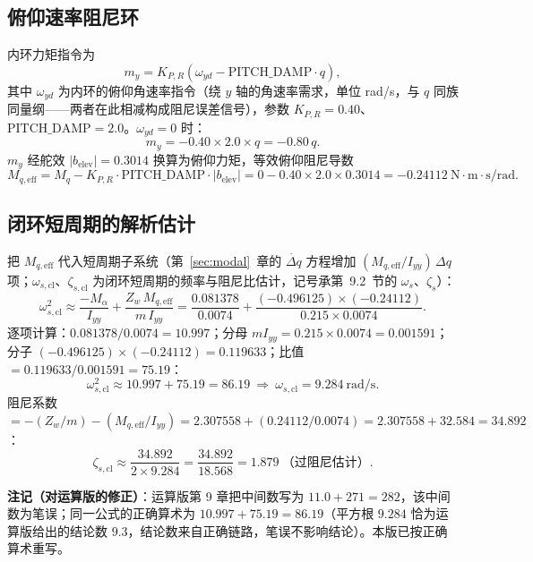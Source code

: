 \documentclass[11pt,a4paper]{ctexart}
\newcommand{\ud}[1]{\dot{#1}}
\begin{document}
\subsection{俯仰速率阻尼环}

内环力矩指令为
\[
m_y = K_{P,R}\left(\omega_{yd} - \mathrm{PITCH\_DAMP}\cdot q\right),
\]
其中 $\omega_{yd}$ 为内环的俯仰角速率指令（绕 $y$ 轴的角速率需求，单位 rad/s，与 $q$ 同族同量纲——两者在此相减构成阻尼误差信号），参数 $K_{P,R}=0.40$、$\mathrm{PITCH\_DAMP}=2.0$。$\omega_{yd}=0$ 时：
\[
m_y = -0.40\times 2.0\times q = -0.80\,q.
\]
$m_y$ 经舵效 $|b_{\mathrm{elev}}|=0.3014$ 换算为俯仰力矩，等效俯仰阻尼导数
\begin{equation}\label{eq:10-2}
M_{q,\mathrm{eff}} = M_q - K_{P,R}\cdot\mathrm{PITCH\_DAMP}\cdot|b_{\mathrm{elev}}|
= 0 - 0.40\times 2.0\times 0.3014 = -0.24112\ \mathrm{N\cdot m\cdot s/rad}.
\tag{(10-2)}
\end{equation}

\subsection{闭环短周期的解析估计}

把 $M_{q,\mathrm{eff}}$ 代入短周期子系统（第~\ref{sec:modal}~章的 $\ud{\Delta q}$ 方程增加 $(M_{q,\mathrm{eff}}/I_{yy})\,\Delta q$ 项；$\omega_{s,\mathrm{cl}}$、$\zeta_{s,\mathrm{cl}}$ 为闭环短周期的频率与阻尼比估计，记号承第~9.2~节的 $\omega_s$、$\zeta_s$）：
\[
\omega_{s,\mathrm{cl}}^2 \approx \frac{-M_\alpha}{I_{yy}} + \frac{Z_w\,M_{q,\mathrm{eff}}}{m\,I_{yy}}
= \frac{0.081378}{0.0074} + \frac{(-0.496125)\times(-0.24112)}{0.215\times 0.0074}.
\]
逐项计算：$0.081378/0.0074 = 10.997$；分母 $m I_{yy} = 0.215\times 0.0074 = 0.001591$；分子 $(-0.496125)\times(-0.24112) = 0.119633$；比值 $= 0.119633/0.001591 = 75.19$：
\[
\omega_{s,\mathrm{cl}}^2 \approx 10.997 + 75.19 = 86.19
\ \Longrightarrow\
\omega_{s,\mathrm{cl}} = 9.284\ \mathrm{rad/s}.
\]
阻尼系数 $= -(Z_w/m) - (M_{q,\mathrm{eff}}/I_{yy}) = 2.307558 + (0.24112/0.0074) = 2.307558+32.584 = 34.892$：
\[
\zeta_{s,\mathrm{cl}} \approx \frac{34.892}{2\times 9.284} = \frac{34.892}{18.568} = 1.879\ \text{（过阻尼估计）}.
\]

\begin{notebox}
\textbf{注记（对运算版的修正）}：运算版第 9 章把中间数写为 $11.0+271=282$，该中间数为笔误；同一公式的正确算术为 $10.997+75.19=86.19$（平方根 $9.284$ 恰为运算版给出的结论数 $9.3$，结论数来自正确链路，笔误不影响结论）。本版已按正确算术重写。
\end{notebox}
\end{document}
